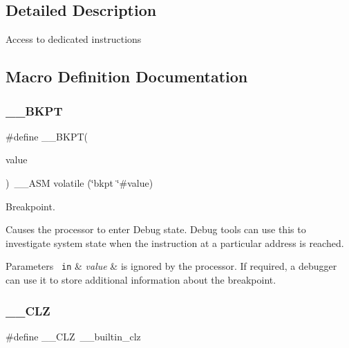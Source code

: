 \subsection{Detailed Description}
Access to dedicated instructions 

\subsection{Macro Definition Documentation}
\mbox{\label{group__CMSIS__Core__InstructionInterface_ga15ea6bd3c507d3e81c3b3a1258e46397}} 
\subsubsection{\texorpdfstring{\_\_BKPT}{\_\_BKPT}}
{\footnotesize\ttfamily \#define \+\_\+\+\_\+\+B\+K\+PT(\begin{DoxyParamCaption}\item[{}]{value }\end{DoxyParamCaption})~\+\_\+\+\_\+\+A\+SM volatile (\char`\"{}bkpt \char`\"{}\#value)}



Breakpoint. 

Causes the processor to enter Debug state. Debug tools can use this to investigate system state when the instruction at a particular address is reached. 
\begin{DoxyParams}[1]{Parameters}
\mbox{\texttt{ in}}  & {\em value} & is ignored by the processor. If required, a debugger can use it to store additional information about the breakpoint. \\
\hline
\end{DoxyParams}
\mbox{\label{group__CMSIS__Core__InstructionInterface_ga5d5bb1527e042be4a9fa5a33f65cc248}} 
\subsubsection{\texorpdfstring{\_\_CLZ}{\_\_CLZ}}
{\footnotesize\ttfamily \#define \+\_\+\+\_\+\+C\+LZ~\+\_\+\+\_\+builtin\+\_\+clz}



